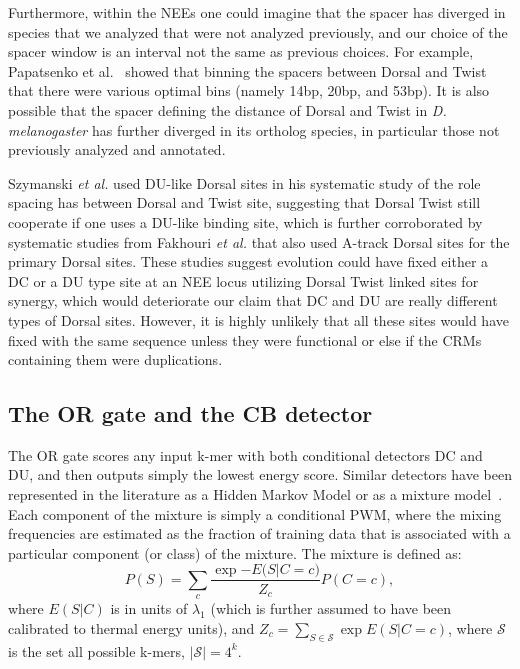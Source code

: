 Furthermore, within the NEEs one could imagine that the spacer has diverged in species that we analyzed that were not analyzed previously, and our choice of the spacer window is an interval not the same as previous choices. For example, Papatsenko et al.~\cite{pmid15795372,pmid19651877} showed that binning the spacers between Dorsal and Twist that there were various optimal bins (namely 14bp, 20bp, and 53bp). It is also possible that the spacer defining the distance of Dorsal and Twist in {\em D. melanogaster} has further diverged in its ortholog species, in particular those not previously analyzed and annotated. 

Szymanski \textit{et al.}\cite{pmid7774581} used DU-like Dorsal sites in his systematic study of the role spacing has between Dorsal and Twist site, suggesting that Dorsal Twist still cooperate if one uses a DU-like binding site, which is further corroborated by systematic studies from Fakhouri \textit{et al.}\cite{pmid20087339} that also used A-track Dorsal sites for the primary Dorsal sites.  These studies suggest evolution could have fixed either a DC or a DU type site at an NEE locus utilizing Dorsal Twist linked sites for synergy, which would deteriorate our claim that DC and DU are really different types of Dorsal sites.  However, it is highly unlikely that all these sites would have fixed with the same sequence unless they were functional or else if the CRMs containing them were duplications.   
\subsection{The OR gate and the CB detector}

The OR gate scores any input k-mer with both conditional detectors DC and DU, and then outputs simply the lowest energy score.  Similar detectors have been represented in the literature as a Hidden Markov Model or as a mixture model~\cite{pmid16236723,Hannenhalli01062005}.
Each component of the mixture is simply a conditional PWM, where the mixing frequencies are estimated as the fraction of training data that is associated with a particular component (or class) of the mixture.  The mixture is defined as:
  \begin{equation}\label{mixpwm}
P(S)=\sum_{c} \frac{\exp{-E(S|C=c})}{Z_c} P(C=c),
\end{equation}
where $E(S|C)$ is in units of $\lambda_1$ (which is further assumed to have been calibrated to thermal energy units), and $Z_c=\sum_{S\in \mathcal S} \exp{E(S|C=c)}$, where $\mathcal S$ is the set all possible k-mers, $|\mathcal S|=4^k$. 


